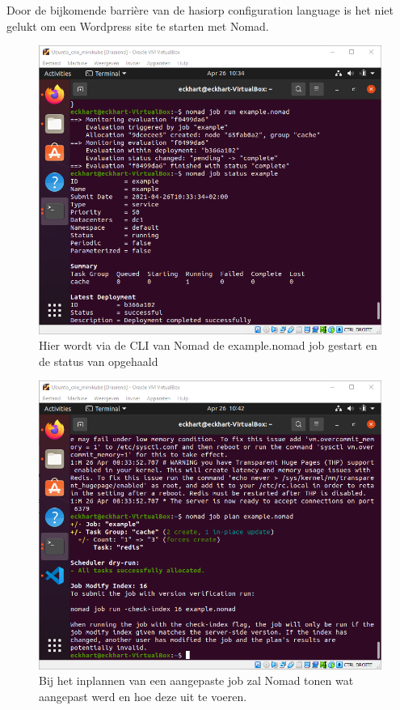 Door de bijkomende barrière van de hasiorp configuration language is het niet gelukt om een Wordpress site te starten met Nomad.
\begin{figure}[h]
    \includegraphics[width=\linewidth]{img/nomadrun.png}
    \caption[Een voorbeeld Nomad job]{Hier wordt via de CLI van Nomad de example.nomad job gestart en de status van opgehaald}
    \label{fig:nomadrun}
    \centering
\end{figure}
\begin{figure}[h]
    \includegraphics[width=\linewidth]{img/nomadplan.png}
    \caption[Een aangepaste job plannen met Nomad]{Bij het inplannen  van een aangepaste job zal Nomad tonen wat aangepast werd en hoe deze uit te voeren.}
    \label{fig:nomdadplan}
    \centering
\end{figure}
